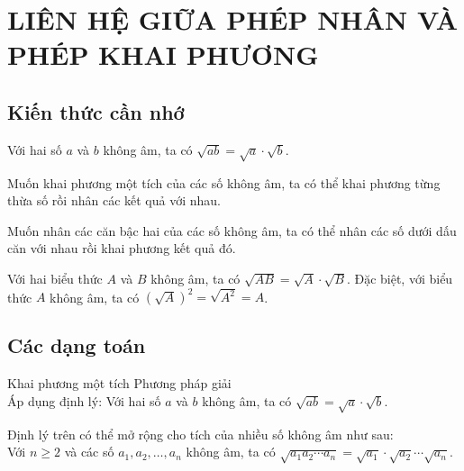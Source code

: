 \section{LIÊN HỆ GIỮA PHÉP NHÂN VÀ PHÉP KHAI PHƯƠNG}
\subsection{Kiến thức cần nhớ}
    \begin{dl}
    	Với hai số $a$ và $b$ không âm, ta có $\sqrt{ab}=\sqrt{a}\cdot \sqrt{b}$.
    \end{dl}   
    \begin{hq}
    	Muốn khai phương một tích của các số không âm, ta có thể khai phương từng thừa số rồi nhân các kết quả với nhau.
    \end{hq}   
	\begin{hq}
		Muốn nhân các căn bậc hai của các số không âm, ta có thể nhân các số dưới dấu căn với nhau rồi khai phương kết quả đó.
	\end{hq}
	\begin{hq}
		Với hai biểu thức $A$ và $B$ không âm, ta có $\sqrt{AB}=\sqrt{A}\cdot \sqrt{B}$. Đặc biệt, với biểu thức $A$ không âm, ta có $\left(\sqrt{A}\right)^2=\sqrt{A^2}=A$.
	\end{hq}
\subsection{Các dạng toán}

\begin{dang}{Khai phương một tích}
    Phương pháp giải\\
    Áp dụng định lý: Với hai số $a$ và $b$ không âm, ta có $\sqrt{ab}=\sqrt{a}\cdot \sqrt{b}$.
    \begin{note}
        Định lý trên có thể mở rộng cho tích của nhiều số không âm như sau:\\
        Với $n\ge 2$ và các số $a_1,a_2,\ldots,a_n$ không âm, ta có $\sqrt{a_1a_2\cdots a_n}=\sqrt{a_1}\cdot \sqrt{a_2}\cdots \sqrt{a_n}$.
    \end{note}
\end{dang}

